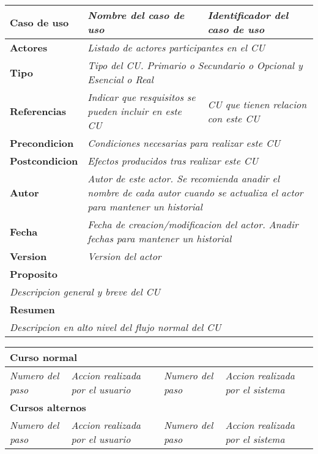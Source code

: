 \begin{tabular}{p{3cm}|p{7cm}|p{2cm}}
\textbf{Caso de uso} & \textit{Nombre del caso de uso} & \textit{Identificador del caso de uso} \\ \hline
\textbf{Actores} & \multicolumn{2}{p{10cm}}{\textit{Listado de actores participantes en el CU}} \\ \hline
\textbf{Tipo} & \multicolumn{2}{p{10cm}}{\textit{Tipo del CU. Primario o Secundario o Opcional y Esencial o Real}} \\ \hline
\textbf{Referencias} & \textit{Indicar que resquisitos se pueden incluir en este CU} & \textit{CU que tienen relacion con este CU} \\ \hline
\textbf{Precondicion} & \multicolumn{2}{p{10cm}}{\textit{Condiciones necesarias para realizar este CU}} \\ \hline
\textbf{Postcondicion} & \multicolumn{2}{p{10cm}}{\textit{Efectos producidos tras realizar este CU}} \\ \hline
\textbf{Autor} & \multicolumn{2}{p{10cm}}{\textit{Autor de este actor. Se recomienda anadir el nombre de cada autor cuando se actualiza el actor para mantener un historial}} \\ \hline
\textbf{Fecha} & \multicolumn{2}{p{10cm}}{\textit{Fecha de creacion/modificacion del actor. Anadir fechas para mantener un historial}} \\ \hline
\textbf{Version} & \multicolumn{2}{p{10cm}}{\textit{Version del actor}} \\  \hline
\multicolumn{3}{p{15cm}}{\textbf{Proposito}} \\ \hline
\multicolumn{3}{p{15cm}}{\textit{Descripcion general y breve del CU}} \\ \hline
\multicolumn{3}{p{15cm}}{\textbf{Resumen}} \\ \hline
\multicolumn{3}{p{15cm}}{\textit{Descripcion en alto nivel del flujo normal del CU}} \\ \hline
\end{tabular}

\begin{tabular}{p{1cm}|p{6cm}|p{1cm}|p{6cm}}
\multicolumn{4}{p{15cm}}{\textbf{Curso normal}} \\ \hline
\textit{Numero del paso} & \textit{Accion realizada por el usuario} & \textit{Numero del paso} & \textit{Accion realizada por el sistema}  \\ \hline
\multicolumn{4}{p{15cm}}{\textbf{Cursos alternos}} \\ \hline
\textit{Numero del paso} & \textit{Accion realizada por el usuario} & \textit{Numero del paso} & \textit{Accion realizada por el sistema}  \\ \hline
\end{tabular}

